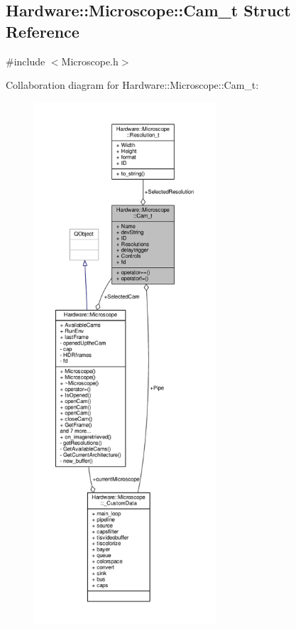 \hypertarget{struct_hardware_1_1_microscope_1_1_cam__t}{}\subsection{Hardware\+:\+:Microscope\+:\+:Cam\+\_\+t Struct Reference}
\label{struct_hardware_1_1_microscope_1_1_cam__t}


{\ttfamily \#include $<$Microscope.\+h$>$}



Collaboration diagram for Hardware\+:\+:Microscope\+:\+:Cam\+\_\+t\+:
\nopagebreak
\begin{figure}[H]
\begin{center}
\leavevmode
\includegraphics[height=550pt]{struct_hardware_1_1_microscope_1_1_cam__t__coll__graph}
\end{center}
\end{figure}
